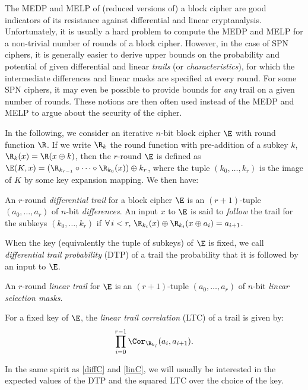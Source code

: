 The MEDP and MELP of (reduced versions of) a block cipher are good indicators of its resistance against differential and linear cryptanalysis.
Unfortunately, it is usually a hard problem to compute the MEDP and MELP for a non-trivial number of rounds of a block cipher.
However, in the case of SPN ciphers,
it is generally easier to derive upper bounds on the probability and potential of given differential and linear
\emph{trails} (or \emph{characteristics}), for which the intermediate differences and linear masks are specified at every round. For some
SPN ciphers, it may even be possible to provide bounds for \emph{any} trail on a given number of rounds. These notions are then often
used instead of the MEDP and MELP to argue about the security of the cipher.

\medskip

In the following, we consider an iterative $n$-bit block cipher $\E$ with round function $\R$. If we write $\R_k$ the
round function with pre-addition of a subkey $k$, \ie $\R_k(x) = \R(x \oplus k)$,
then the $r$-round $\E$ is defined as $\E(K,x) = (\R_{k_{r-1}} \circ \cdots \circ \R_{k_0}(x)) \oplus k_r$, where the tuple
$(k_0,\ldots,k_r)$ is the image of $K$ by some key expansion mapping. We then have:

\begin{defi}
An $r$-round \emph{differential trail} for a block cipher $\E$ is an $(r+1)$-tuple $(a_0,\ldots,a_r)$ of $n$-bit \emph{differences}.
An input $x$ to $\E$ is said to \emph{follow} the trail for the subkeys $(k_0,\ldots,k_r)$
if $\forall\, i < r,\,\R_{k_i}(x) \oplus \R_{k_i}(x \oplus a_i) = a_{i+1}$.

\noindent
When the key (equivalently the tuple of subkeys) of $\E$ is fixed, we call \emph{differential trail probability} (DTP) of a trail the probability
that it is followed by an input to $\E$.
\end{defi}

\begin{defi}
\label{linT}
An $r$-round \emph{linear trail} for $\E$ is an $(r+1)$-tuple $(a_0,\ldots,a_r)$ of $n$-bit \emph{linear selection masks}.

\noindent
For a fixed key of $\E$, the \emph{linear trail correlation} (LTC) of a trail is given by:
\[
\prod_{i=0}^{r-1} \Cor_{\R_{k_i}}(a_i, a_{i+1}).
\]
\end{defi}

In the same spirit as \autoref{diffC} and \autoref{linC}, we will usually be interested in the expected values of the DTP
and the squared LTC over the choice of the key.

